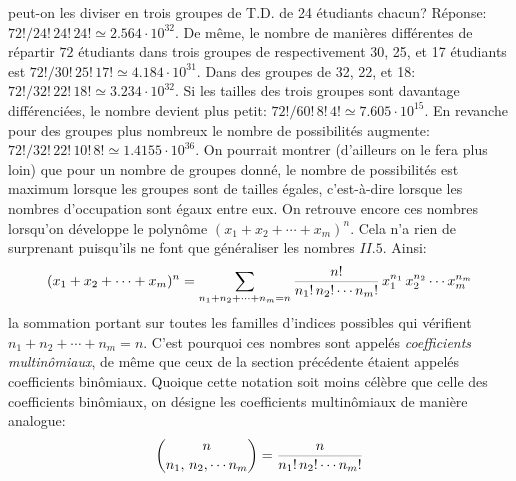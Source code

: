 peut-on les diviser en trois groupes de T.D. de 24 \'etudiants chacun? 
R\'eponse:  ${72! / 24!\, 24!\, 24!} \simeq 2.564 \cdot 10^{32}$.  De 
m\^eme, le nombre de mani\`eres diff\'erentes de r\'epartir $72$  
\'etudiants dans trois groupes de respectivement 30, 25, et 17 
\'etudiants est ${72! / 30!\, 25!\, 17!} \simeq 4.184 \cdot 10^{31}$. Dans 
des groupes de 32, 22, et 18: ${72! / 32!\, 22!\, 18!} \simeq 3.234 \cdot 
10^{32}$. Si les tailles des trois groupes sont davantage 
diff\'erenci\'ees, le nombre devient plus petit: ${72! / 60!\, 8!\, 4!} 
\simeq 7.605 \cdot 10^{15}$. En revanche pour des groupes plus nombreux 
le nombre de possibilit\'es augmente: ${72! / 32!\, 22!\, 10!\, 8!} \simeq 
1.4155 \cdot 10^{36}$. On pourrait montrer (d'ailleurs on le fera plus 
loin) que pour un nombre de groupes donn\'e, le nombre de possibilit\'es 
est maximum lorsque les  groupes sont de tailles \'egales, 
c'est-\`a-dire lorsque les nombres d'occupation sont \'egaux entre eux.  
\medskip  
On retrouve encore ces nombres lorsqu'on d\'eveloppe le polyn\^ome 
$(x_1 + x_2 + \cdots + x_m)^n$. Cela n'a rien de surprenant puisqu'ils ne 
font que g\'en\'eraliser les nombres $II.5.$ Ainsi: 
$$(x_1 + x_2 + \cdots + x_m)^n = \sum_{n_1+n_2+ \cdots +n_m=n}  {n! 
\over n_1!\,  n_2! \cdots n_m!}\, x_1^{n_1}\, x_2^{n_2} \cdots  
 x_m^{n_m} $$  
la sommation portant sur toutes les familles d'indices possibles qui 
v\'erifient $n_1 + n_2 +  \cdots  + n_m = n$. C'est pourquoi ces nombres  
sont appel\'es {\it coefficients multin\^omiaux}, de m\^eme que ceux de  
la section pr\'ec\'edente \'etaient appel\'es coefficients bin\^omiaux. 
Quoique cette notation soit moins c\'el\`ebre que celle des coefficients 
bin\^omiaux, on d\'esigne les coefficients  multin\^omiaux de mani\`ere 
analogue:  
$${n \choose n_1,\,  n_2,  \cdots   n_m} = {n \over n_1!\,  n_2! 
\cdots   n_m!}$$ 
 
